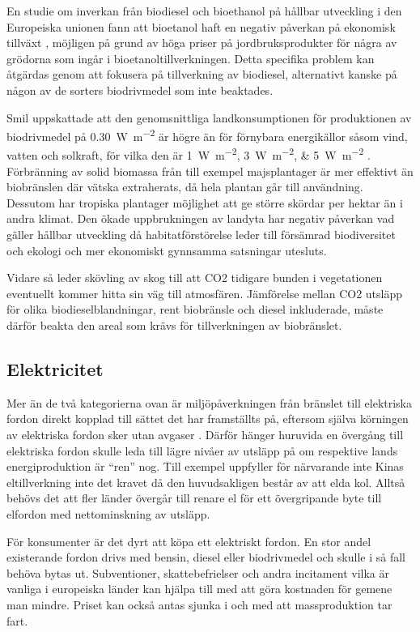 \documentclass{article}
\begin{document}
En studie om inverkan från biodiesel och bioethanol
på hållbar utveckling i den Europeiska unionen
fann att bioetanol haft en negativ påverkan på ekonomisk tillväxt
\autocite{simionescu17},
möjligen på grund av höga priser på jordbruksprodukter för några av grödorna
som ingår i bioetanoltillverkningen.
Detta specifika problem kan åtgärdas genom att
fokusera på tillverkning av biodiesel,
alternativt kanske på någon av de sorters biodrivmedel som inte beaktades.

Smil uppskattade att den genomsnittliga landkonsumptionen för produktionen
av biodrivmedel på \SI{0.30}{\watt\per\meter\squared}
är högre än för förnybara energikällor såsom vind, vatten och solkraft,
för vilka den är \SIlist[list-final-separator={ respektive }]{1; 3; 5}{\watt\per\meter\squared}
\autocite{smil15}.
Förbränning av solid biomassa från till exempel majsplantager
är mer effektivt än biobränslen där vätska extraherats,
då hela plantan går till användning.
Dessutom har tropiska plantager möjlighet att ge större skördar per hektar
än i andra klimat.
Den ökade uppbrukningen av landyta har negativ påverkan vad gäller hållbar utveckling
då habitatförstörelse leder till försämrad biodiversitet och ekologi
och mer ekonomiskt gynnsamma satsningar utesluts.

Vidare så leder skövling av skog till att CO2 tidigare bunden i vegetationen
eventuellt kommer hitta sin väg till atmosfären.
Jämförelse mellan CO2 utsläpp för olika biodieselblandningar,
rent biobränsle och diesel inkluderade,
måste därför beakta den areal som krävs för tillverkningen av biobränslet.

\subsection{Elektricitet}

Mer än de två kategorierna ovan är miljöpåverkningen från bränslet till elektriska fordon
direkt kopplad till sättet det har framställts på,
eftersom själva körningen av elektriska fordon sker utan avgaser \autocite{persson18}.
Därför hänger huruvida en övergång till elektriska fordon skulle leda till
lägre nivåer av utsläpp på om respektive lands energiproduktion är ``ren'' nog.
Till exempel uppfyller för närvarande inte Kinas eltillverkning inte det kravet
då den huvudsakligen består av att elda kol.
Alltså behövs det att fler länder övergår till renare el
för ett övergripande byte till elfordon med nettominskning av utsläpp.

För konsumenter är det dyrt att köpa ett elektriskt fordon.
En stor andel existerande fordon drivs med bensin, diesel eller biodrivmedel
och skulle i så fall behöva bytas ut.
Subventioner, skattebefrielser och andra incitament vilka är vanliga i europeiska länder
kan hjälpa till med att göra kostnaden för gemene man mindre.
Priset kan också antas sjunka i och med att massproduktion tar fart.
\end{document}
